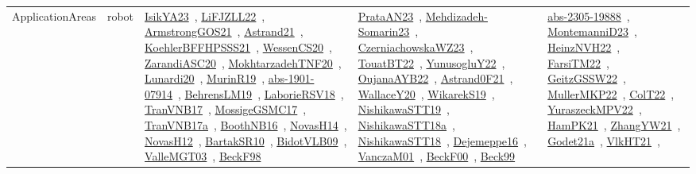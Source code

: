 {\begin{longtable}{lp{3cm}>{\raggedright\arraybackslash}p{6cm}>{\raggedright\arraybackslash}p{6cm}>{\raggedright\arraybackslash}p{8cm}}
ApplicationAreas & robot & \href{works/IsikYA23.pdf}{IsikYA23}~\cite{IsikYA23}, \href{works/LiFJZLL22.pdf}{LiFJZLL22}~\cite{LiFJZLL22}, \href{works/ArmstrongGOS21.pdf}{ArmstrongGOS21}~\cite{ArmstrongGOS21}, \href{works/Astrand21.pdf}{Astrand21}~\cite{Astrand21}, \href{works/KoehlerBFFHPSSS21.pdf}{KoehlerBFFHPSSS21}~\cite{KoehlerBFFHPSSS21}, \href{works/WessenCS20.pdf}{WessenCS20}~\cite{WessenCS20}, \href{works/ZarandiASC20.pdf}{ZarandiASC20}~\cite{ZarandiASC20}, \href{works/MokhtarzadehTNF20.pdf}{MokhtarzadehTNF20}~\cite{MokhtarzadehTNF20}, \href{works/Lunardi20.pdf}{Lunardi20}~\cite{Lunardi20}, \href{works/MurinR19.pdf}{MurinR19}~\cite{MurinR19}, \href{works/abs-1901-07914.pdf}{abs-1901-07914}~\cite{abs-1901-07914}, \href{works/BehrensLM19.pdf}{BehrensLM19}~\cite{BehrensLM19}, \href{works/LaborieRSV18.pdf}{LaborieRSV18}~\cite{LaborieRSV18}, \href{works/TranVNB17.pdf}{TranVNB17}~\cite{TranVNB17}, \href{works/MossigeGSMC17.pdf}{MossigeGSMC17}~\cite{MossigeGSMC17}, \href{works/TranVNB17a.pdf}{TranVNB17a}~\cite{TranVNB17a}, \href{works/BoothNB16.pdf}{BoothNB16}~\cite{BoothNB16}, \href{works/NovasH14.pdf}{NovasH14}~\cite{NovasH14}, \href{works/NovasH12.pdf}{NovasH12}~\cite{NovasH12}, \href{works/BartakSR10.pdf}{BartakSR10}~\cite{BartakSR10}, \href{works/BidotVLB09.pdf}{BidotVLB09}~\cite{BidotVLB09}, \href{works/ValleMGT03.pdf}{ValleMGT03}~\cite{ValleMGT03}, \href{works/BeckF98.pdf}{BeckF98}~\cite{BeckF98} & \href{works/PrataAN23.pdf}{PrataAN23}~\cite{PrataAN23}, \href{works/Mehdizadeh-Somarin23.pdf}{Mehdizadeh-Somarin23}~\cite{Mehdizadeh-Somarin23}, \href{works/CzerniachowskaWZ23.pdf}{CzerniachowskaWZ23}~\cite{CzerniachowskaWZ23}, \href{works/TouatBT22.pdf}{TouatBT22}~\cite{TouatBT22}, \href{works/YunusogluY22.pdf}{YunusogluY22}~\cite{YunusogluY22}, \href{works/OujanaAYB22.pdf}{OujanaAYB22}~\cite{OujanaAYB22}, \href{works/Astrand0F21.pdf}{Astrand0F21}~\cite{Astrand0F21}, \href{works/WallaceY20.pdf}{WallaceY20}~\cite{WallaceY20}, \href{works/WikarekS19.pdf}{WikarekS19}~\cite{WikarekS19}, \href{works/NishikawaSTT19.pdf}{NishikawaSTT19}~\cite{NishikawaSTT19}, \href{works/NishikawaSTT18a.pdf}{NishikawaSTT18a}~\cite{NishikawaSTT18a}, \href{works/NishikawaSTT18.pdf}{NishikawaSTT18}~\cite{NishikawaSTT18}, \href{works/Dejemeppe16.pdf}{Dejemeppe16}~\cite{Dejemeppe16}, \href{works/VanczaM01.pdf}{VanczaM01}~\cite{VanczaM01}, \href{works/BeckF00.pdf}{BeckF00}~\cite{BeckF00}, \href{works/Beck99.pdf}{Beck99}~\cite{Beck99} & \href{works/abs-2305-19888.pdf}{abs-2305-19888}~\cite{abs-2305-19888}, \href{works/MontemanniD23.pdf}{MontemanniD23}~\cite{MontemanniD23}, \href{works/HeinzNVH22.pdf}{HeinzNVH22}~\cite{HeinzNVH22}, \href{works/FarsiTM22.pdf}{FarsiTM22}~\cite{FarsiTM22}, \href{works/GeitzGSSW22.pdf}{GeitzGSSW22}~\cite{GeitzGSSW22}, \href{works/MullerMKP22.pdf}{MullerMKP22}~\cite{MullerMKP22}, \href{works/ColT22.pdf}{ColT22}~\cite{ColT22}, \href{works/YuraszeckMPV22.pdf}{YuraszeckMPV22}~\cite{YuraszeckMPV22}, \href{works/HamPK21.pdf}{HamPK21}~\cite{HamPK21}, \href{works/ZhangYW21.pdf}{ZhangYW21}~\cite{ZhangYW21}, \href{works/Godet21a.pdf}{Godet21a}~\cite{Godet21a}, \href{works/VlkHT21.pdf}{VlkHT21}~\cite{VlkHT21}, 
\end{longtable}}
